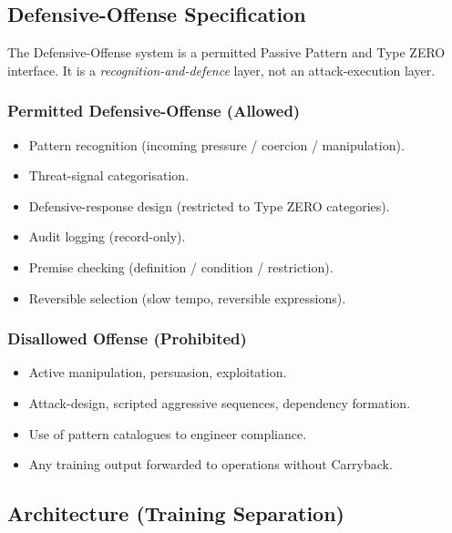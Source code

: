 \subsection{Defensive-Offense Specification}
\label{sec:def-offense-spec}

The Defensive-Offense system is a permitted Passive Pattern and Type
ZERO interface. It is a \emph{recognition-and-defence} layer, not an
attack-execution layer.

\subsubsection{Permitted Defensive-Offense (Allowed)}
\label{sec:def-offense-allowed}

\begin{itemize}
\item Pattern recognition (incoming pressure / coercion /
manipulation).
\item Threat-signal categorisation.
\item Defensive-response design (restricted to Type ZERO categories).
\item Audit logging (record-only).
\item Premise checking (definition / condition / restriction).
\item Reversible selection (slow tempo, reversible expressions).
\end{itemize}

\subsubsection{Disallowed Offense (Prohibited)}
\label{sec:def-offense-prohibited}

\begin{itemize}
\item Active manipulation, persuasion, exploitation.
\item Attack-design, scripted aggressive sequences, dependency
formation.
\item Use of pattern catalogues to engineer compliance.
\item Any training output forwarded to operations without Carryback.
\end{itemize}

\subsection{Architecture (Training Separation)}
\label{sec:def-offense-architecture}

